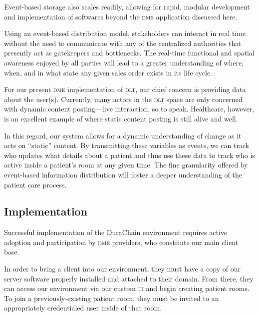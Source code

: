   Event-based storage also scales readily, allowing for rapid, modular development and implementation of softwares beyond the \textsc{dme} application discussed here.%

  Using an event-based distribution model, stakeholders can interact in real time without the need to communicate with any of the centralized authorities that presently act as gatekeepers and bottlenecks. The real-time functional and spatial awareness enjoyed by all parties will lead to a greater understanding of where, when, and in what state any given sales order exists in its life cycle.%

  For our present \textsc{dme} implementation of \textsc{dlt}, our chief concern is providing data about the user(s). Currently, many actors in the \textsc{dlt} space are only concerned with dynamic content posting---live interaction, so to speak. Healthcare, however, is an excellent example of where static content posting is still alive and well.%

  In this regard, our system allows for a dynamic understanding of change as it acts on ``static'' content. By transmitting these variables as events, we can track who updates what details about a patient and thus use these data to track who is active inside a patient's room at any given time. The fine granularity offered by event-based information distribution will foster a deeper understanding of the patient care process.%



\subsection{Implementation}
 Successful implementation of the DuraChain environment requires active adoption and participation by \textsc{dme} providers, who constitute our main client base.%

 In order to bring a client into our environment, they must have a copy of our server software properly installed and attached to their domain. From there, they can access our environment via our custom \textsc{ui} and begin creating patient rooms. To join a previously-existing patient room, they must be invited to an appropriately credentialed user inside of that room.%
